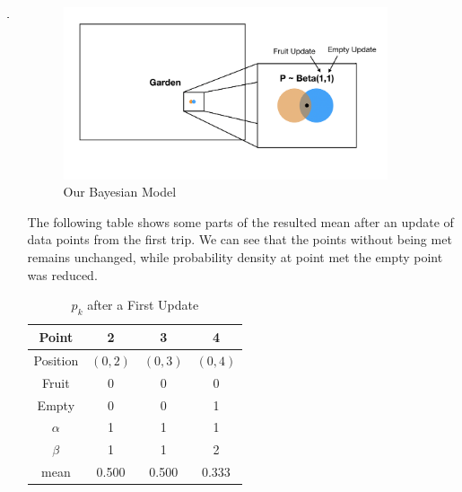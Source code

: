 \documentclass[final]{beamer}
\begin{document}
\begin{frame}
\begin{columns}[t]
\begin{column}{\marginwidth-\parsep}\end{column} %

\begin{column}{\colwidth} %
\begin{tcolorbox}[width=\colwidth,height=\contentheight,top=.2in]
\begin{block}{}

\vspace{-.2in}

\begin{figure}[H]
\includegraphics[width=0.9\textwidth]{model}
\caption{Our Bayesian Model}
\end{figure}

\vspace{-.3in}

The following table shows some parts of the resulted mean after an update of data points from the first trip. We can see that the points without being met remains unchanged, while probability density at point met the empty point was reduced.

\vspace{0.2in}
    
\begin{table}[H]
\centering
\begin{tabular}{|c|c|c|c|}
\hline
Point & 2 & 3 & 4\\
\hline
Position & $(0,2)$ & $(0,3)$ & $(0,4)$ \\
\hline 
Fruit & 0 & 0 & 0 \\
\hline
Empty & 0 & 0 & 1 \\
\hline
$\alpha$ & 1 & 1 & 1\\
\hline
$\beta$ & 1 & 1 & 2\\
\hline
mean & 0.500 & 0.500 & 0.333\\
\hline
\end{tabular}
\caption{$p_k$ after a First Update}
\end{table}


\end{block}
\end{tcolorbox}
\end{column}
\end{columns}
\end{frame}
\end{document}
